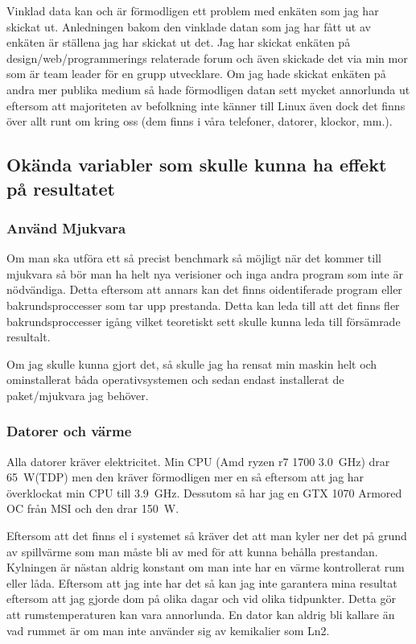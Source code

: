 \documentclass[12pt, a4paper]{report}
\begin{document}
Vinklad data kan och är förmodligen ett problem med enkäten som jag har skickat ut. Anledningen bakom den vinklade datan som jag har fått ut av enkäten är ställena jag har skickat ut det. Jag har skickat enkäten på design/web/programmerings relaterade forum och även skickade det via min mor som är team leader för en grupp utvecklare. Om jag hade skickat enkäten på andra mer publika medium så hade förmodligen datan sett mycket annorlunda ut eftersom att majoriteten av befolkning inte känner till Linux även dock det finns över allt runt om kring oss (dem finns i våra telefoner, datorer, klockor, mm.). 

\subsection{Okända variabler som skulle kunna ha effekt på resultatet}


\subsubsection{Använd Mjukvara}

Om man ska utföra ett så precist benchmark så möjligt när det kommer till mjukvara så bör man ha helt nya verisioner och inga andra program som inte är nödvändiga. Detta eftersom att annars kan det finns oidentiferade program eller bakrundsproccesser som tar upp prestanda. Detta kan leda till att det finns fler bakrundsproccesser igång vilket teoretiskt sett skulle kunna leda till försämrade resultalt.

Om jag skulle kunna gjort det, så skulle jag ha rensat min maskin helt och ominstallerat båda operativsystemen och sedan endast installerat de paket/mjukvara jag behöver.

\subsubsection{Datorer och värme}

Alla datorer kräver elektricitet. Min CPU (Amd ryzen r7 1700 \SI{3.0}{\giga\hertz}) drar \SI{65}{\watt}(TDP)\cite{ryzen1700spec} men den kräver förmodligen mer en så eftersom att jag har överklockat min CPU till \SI{3.9}{\giga\hertz}.
Dessutom så har jag en GTX 1070 Armored OC från MSI\cite{1070} och den drar \SI{150}{\watt}.

Eftersom att det finns el i systemet så kräver det att man kyler ner det på grund av spillvärme\cite{wasteheat} som man måste bli av med för att kunna behålla prestandan. Kylningen är nästan aldrig konstant om man inte har en värme kontrollerat rum eller låda. Eftersom att jag inte har det så kan jag inte garantera mina resultat eftersom att jag gjorde dom på olika dagar och vid olika tidpunkter. Detta gör att rumstemperaturen kan vara annorlunda. En dator kan aldrig bli kallare än vad rummet är\cite{thermodynamics} om man inte använder sig av kemikalier som Ln2.
\end{document}
